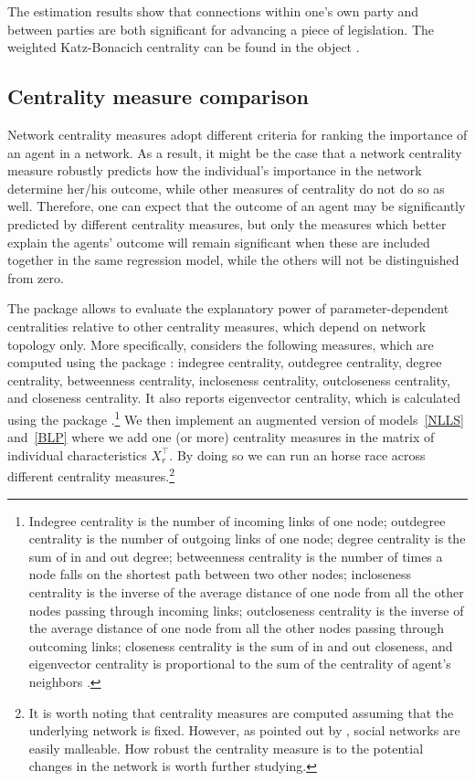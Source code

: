 \documentclass[nojss]{jss}
\begin{document}
The estimation results show that connections within one's own party and between parties are both significant for advancing a piece of legislation. The weighted Katz-Bonacich centrality can be found in the object .

\subsection{Centrality measure comparison}
Network centrality measures adopt different criteria for ranking the importance of an agent in a network. As a result, it might be the case that a network centrality measure robustly predicts how the individual's importance in the network determine her/his outcome, while other measures of centrality do not do so as well. Therefore, one can expect that the outcome of an agent may be significantly predicted by different centrality measures, but only the measures which better explain the agents' outcome will remain significant when these are included together in the same regression model, while the others will not be distinguished from zero.

The  package  allows to evaluate the explanatory power of parameter-dependent centralities relative to other centrality measures, which depend on network topology only. More specifically,  considers the following measures, which are computed using the  package  \citep{igraph}: indegree centrality, outdegree centrality, degree centrality, betweenness centrality, incloseness centrality, outcloseness centrality, and closeness centrality. It also reports eigenvector centrality, which is calculated using the  package  \citep{sna}.\footnote{Indegree centrality is the number of incoming links of one node; outdegree centrality is the number of outgoing links of one node; degree centrality is the sum of in and out degree; betweenness centrality is the number of times a node falls on the shortest path between two other nodes; incloseness centrality is the inverse of the average distance of one node from all the other nodes passing through incoming links; outcloseness centrality is the inverse of the average distance of one node from all the other nodes passing through outcoming links; closeness centrality is the sum of in and out closeness, and eigenvector centrality is proportional to the sum of the centrality of agent's neighbors \cite[see][for further details]{Jackson:2010}.}
We then implement an augmented version of models~\ref{NLLS} and~\ref{BLP} where we add one (or more) centrality measures in the matrix of individual characteristics $X_{r}^\top.$ By doing so we can run an horse race across different centrality measures.\footnote{It is worth noting that centrality measures are computed assuming that the underlying network is fixed. However, as pointed out by \cite{An:2015b}, social networks are easily malleable. How robust the centrality measure is to the potential changes in the network is worth further studying.}
\end{document}
